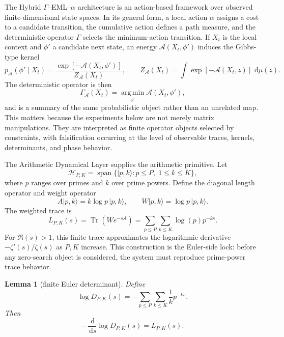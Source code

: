 \documentclass[11pt]{article}
\newcommand{\Tr}{\operatorname{Tr}}
\newcommand{\argmin}{\operatorname*{arg\,min}}
\newcommand{\dd}{\,\mathrm{d}}
\theoremstyle{definition}
\theoremstyle{plain}
\newtheorem{lemma}{Lemma}
\begin{document}
The Hybrid $\Gamma$--EML--$\alpha$ architecture is an action-based framework over observed finite-dimensional state spaces.  In its general form, a local action $\alpha$ assigns a cost to a candidate transition, the cumulative action defines a path measure, and the deterministic operator $\Gamma$ selects the minimum-action transition.  If $X_t$ is the local context and $\phi'$ a candidate next state, an energy $\mathcal A(X_t,\phi')$ induces the Gibbs-type kernel
\begin{equation}
  p_{\mathcal A}(\phi'\mid X_t)
  = \frac{\exp[-\mathcal A(X_t,\phi')]}{Z_{\mathcal A}(X_t)},
  \qquad
  Z_{\mathcal A}(X_t)=\int \exp[-\mathcal A(X_t,z)]\,\dd \mu(z).
\end{equation}
The deterministic operator is then
\begin{equation}
  \Gamma_{\mathcal A}(X_t)=\argmin_{\phi'} \mathcal A(X_t,\phi'),
\end{equation}
and is a summary of the same probabilistic object rather than an unrelated map.  This matters because the experiments below are not merely matrix manipulations.  They are interpreted as finite operator objects selected by constraints, with falsification occurring at the level of observable traces, kernels, determinants, and phase behavior.

The Arithmetic Dynamical Layer supplies the arithmetic primitive.  Let
\begin{equation}
  \mathcal H_{P,K}=\operatorname{span}\{|p,k\rangle: p\le P,\;1\le k\le K\},
\end{equation}
where $p$ ranges over primes and $k$ over prime powers.  Define the diagonal length operator and weight operator
\begin{equation}
  A|p,k\rangle = k\log p\,|p,k\rangle,
  \qquad
  W|p,k\rangle = \log p\,|p,k\rangle.
\end{equation}
The weighted trace is
\begin{equation}
  L_{P,K}(s)=\Tr(We^{-sA})=
  \sum_{p\le P}\sum_{k\le K} \log(p) p^{-ks}.
\end{equation}
For $\Re(s)>1$, this finite trace approximates the logarithmic derivative $-\zeta'(s)/\zeta(s)$ as $P,K$ increase.  This construction is the Euler-side lock: before any zero-search object is considered, the system must reproduce prime-power trace behavior.

\begin{lemma}[finite Euler determinant]
Define
\begin{equation}
  \log D_{P,K}(s)=
  -\sum_{p\le P}\sum_{k\le K}\frac{1}{k}p^{-ks}.
\end{equation}
Then
\begin{equation}
  -\frac{\dd}{\dd s}\log D_{P,K}(s)=L_{P,K}(s).
\end{equation}
\end{lemma}
\end{document}
